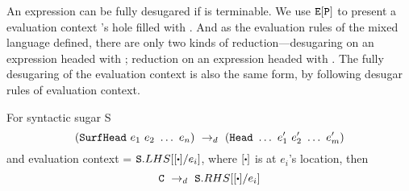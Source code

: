 An expression  can be fully desugared if  is terminable. We use $\mbox{\tt E}[\mbox{\tt P}]$ to present a evaluation context 's hole filled with . And as the evaluation rules of the mixed language defined, there are only two kinds of reduction---desugaring on an expression headed with ; reduction on an expression headed with . The fully desugaring of the evaluation context is also the same form, by following desugar rules of evaluation context.

\begin{Def}
	For syntactic sugar S
	\[
	(\mbox{\tt SurfHead}~e_1~e_2~\ldots~e_n) ~\rightarrow_d~ (\mbox{\tt Head}~\ldots~e_1'~e_2'~\ldots~e_m')
	\]
	and evaluation context  = $\m{S}.LHS[[\bigcdot]/e_i]$, where $[\bigcdot]$ is at $e_i$'s location, then
	\[
	\drule{\m{C}}{\m{S}.RHS[[\bigcdot]/e_i]}
	\]
	
	\end{Def}


